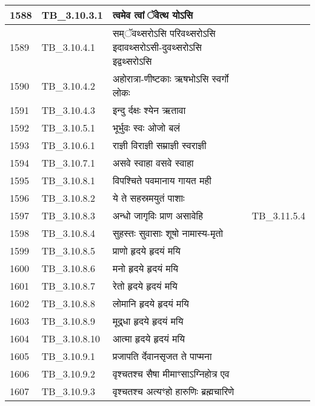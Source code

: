 \documentclass[17pt]{extarticle}
\begin{document}
\begin{longtable}{||p{0.4in}||p{0.9in}||p{4.0in}||p{0.9in}||}
        \hline
            1588 & TB\_3.10.3.1 & त्वमेव त्वां ॅवेत्थ योऽसि &      \\
        \hline
            1589 & TB\_3.10.4.1 & सम्ॅवथ्सरोऽसि परिवथ्सरोऽसि इदावथ्सरोऽसी{-}दुवथ्सरोऽसि इद्वथ्सरोऽसि &      \\
        \hline
            1590 & TB\_3.10.4.2 & अहोरात्रा{-}णीष्टकाः ऋषभोऽसि स्वर्गो लोकः &      \\
        \hline
            1591 & TB\_3.10.4.3 & इन्दु र्दक्षः श्येन ऋतावा &      \\
        \hline
            1592 & TB\_3.10.5.1 & भूर्भुवः स्वः ओजो बलं &      \\
        \hline
            1593 & TB\_3.10.6.1 & राज्ञी विराज्ञी सम्राज्ञी स्वराज्ञी &      \\
        \hline
            1594 & TB\_3.10.7.1 & असवे स्वाहा वसवे स्वाहा &      \\
        \hline
            1595 & TB\_3.10.8.1 & विपश्चिते पवमानाय गायत मही &      \\
        \hline
            1596 & TB\_3.10.8.2 & ये ते सहस्रमयुतं पाशाः &      \\
        \hline
            1597 & TB\_3.10.8.3 & अन्धो जागृविः प्राण असावेहि &  TB\_3.11.5.4       \\
        \hline
            1598 & TB\_3.10.8.4 & सुहस्तः सुवासाः शूषो नामास्य{-}मृतो &      \\
        \hline
            1599 & TB\_3.10.8.5 & प्राणो हृदये हृदयं मयि &      \\
        \hline
            1600 & TB\_3.10.8.6 & मनो हृदये हृदयं मयि &      \\
        \hline
            1601 & TB\_3.10.8.7 & रेतो हृदये हृदयं मयि &      \\
        \hline
            1602 & TB\_3.10.8.8 & लोमानि हृदये हृदयं मयि &      \\
        \hline
            1603 & TB\_3.10.8.9 & मूद्र्धा हृदये हृदयं मयि &      \\
        \hline
            1604 & TB\_3.10.8.10 & आत्मा हृदये हृदयं मयि &      \\
        \hline
            1605 & TB\_3.10.9.1 & प्रजापति र्देवानसृजत ते पाप्मना &      \\
        \hline
            1606 & TB\_3.10.9.2 & वृश्चतश्च सैषा मीमाꣳसाऽग्निहोत्र एव &      \\
        \hline
            1607 & TB\_3.10.9.3 & वृश्चतश्च अत्यꣳहो हारुणिः ब्रह्मचारिणे &      \\
        \hline

\end{longtable}
\end{document}
